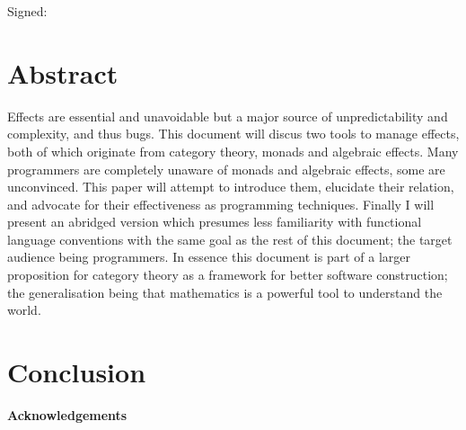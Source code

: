\documentclass[a4paper,10pt]{article}
\newenvironment{spaced}[1]
  {\begin{minipage}[c]{\textwidth}\vspace{#1}}
  {\end{minipage}}
\theoremstyle{definition}
\begin{document}
  \begin{spaced}{5em}
    Signed:
  \end{spaced}
\pagebreak

\section{Abstract}

Effects are essential and unavoidable
but a major source of unpredictability
and complexity, and thus bugs.
This document will discus two tools to manage effects,
both of which originate from category theory,
monads and algebraic effects.
Many programmers are completely unaware of monads and algebraic effects,
some are unconvinced.
This paper will attempt to introduce them,
elucidate their relation,
and advocate for their effectiveness as programming techniques.
Finally I will present an abridged version
which presumes less familiarity with functional language conventions
with the same goal as the rest of this document;
the target audience being programmers.
In essence this document is part of a larger
proposition for category theory as a framework for better software construction;
the generalisation being that mathematics is a powerful tool to understand the world.

\pagebreak
\tableofcontents

\pagebreak


\pagebreak


\pagebreak


\pagebreak


\pagebreak


\pagebreak
\section{Conclusion}
%
%
%
%

\textbf{Acknowledgements}

\pagebreak
\appendix



\pagebreak


\end{document}

